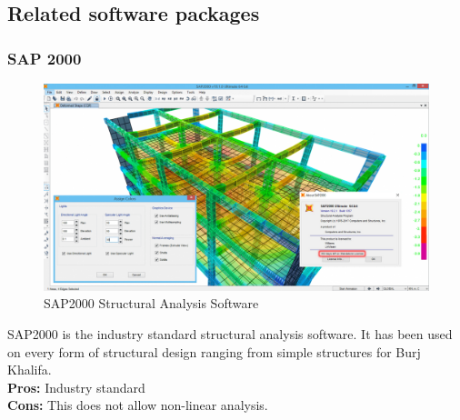 \documentclass[12pt]{article}
\begin{document}
\subsection{Related software packages}
\subsubsection{SAP 2000}
\begin{figure}
    \centering
    \includegraphics[scale=0.2]{images/sap.jpg}
    \caption{SAP2000 Structural Analysis Software}
    \label{fig:my_label}
\end{figure}
SAP2000 is the industry standard structural analysis software. It has been used on every form of structural design ranging from simple structures for Burj Khalifa.\\

\textbf{Pros:} Industry standard\\
\textbf{Cons:} This does not allow non-linear analysis.\\
\end{document}
